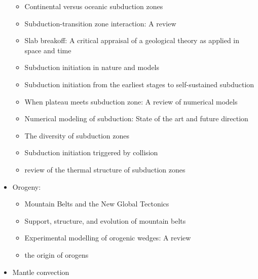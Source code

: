 \begin{itemize}
\begin{itemize}
   \item [\twothousandsixteen] Continental versus oceanic subduction zones \cite{zhch16}
   \item [\twothousandseventeen] Subduction-transition zone interaction: A review \cite{goav17}
   \item [\twothousandeighteen] Slab breakoff: A critical appraisal of a geological theory as applied in space and time \cite{garm18}
   \item [\twothousandeighteen] Subduction initiation in nature and models \cite{stge18}
   \item [\twothousandtwentyone] Subduction initiation from the earliest stages to self-sustained subduction \cite{laar21}
   \item [\twothousandtwentyone] When plateau meets subduction zone: A review of numerical models \cite{lidl21}
   \item [\twothousandtwentytwo] Numerical modeling of subduction: State of the art and future direction \cite{gery22}
   \item [\twothousandtwentytwo] The diversity of subduction zones \cite{chmm22}
   \item [\twothousandtwentytwo] Subduction initiation triggered by collision \cite{yang22} 
   \item [\twothousandtwentythree] review of the thermal structure of subduction zones \cite{vawi23,wiva23}

   \end{itemize}

\item Orogeny:
   \begin{itemize}
   \item [\nineteenseventy] Mountain Belts and the New Global Tectonics  \cite{debi70}
   \item [\nineteeneightyeight] Support, structure, and evolution of mountain belts \cite{moly88}
   \item [\twothousandtwelve] Experimental modelling of orogenic wedges: A review \cite{grmd12} 
   \item [\twothousandthirteen] the origin of orogens \cite{jabe13}
   \end{itemize}

\item Mantle convection 


\end{itemize}
